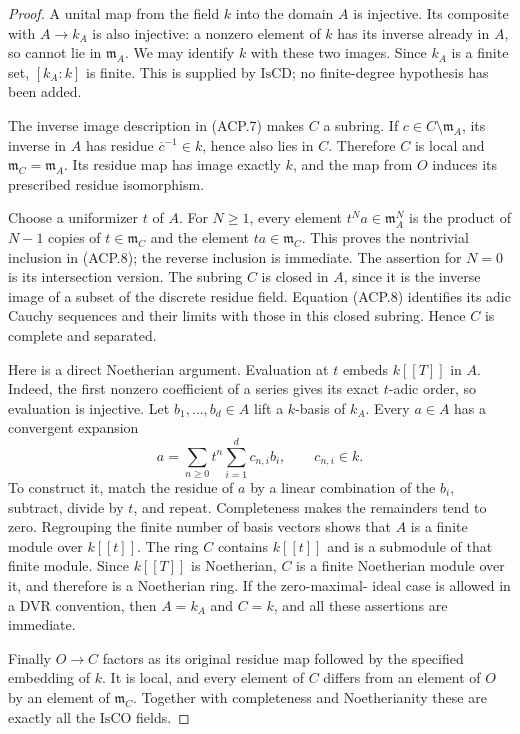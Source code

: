 \documentclass[11pt,a4paper]{article}
\numberwithin{equation}{section}
\theoremstyle{remark}\newtheorem{remark}[theorem]{Remark}
\begin{document}
\begin{proof}
A unital map from the field \(k\) into the domain \(A\) is
injective.  Its composite with \(A\to k_A\) is also injective:
a nonzero element of \(k\) has its inverse already in \(A\),
so cannot lie in \(\mathfrak m_A\).  We may identify \(k\)
with these two images.  Since \(k_A\) is a finite set,
\([k_A:k]\) is finite.  This is supplied by \(\mathrm{IsCD}\);
no finite-degree hypothesis has been added.

The inverse image description in (ACP.7) makes \(C\) a subring.
If \(c\in C\setminus\mathfrak m_A\), its inverse in \(A\)
has residue \(\overline c^{-1}\in k\), hence also lies in \(C\).
Therefore \(C\) is local and \(\mathfrak m_C=\mathfrak m_A\).
Its residue map has image exactly \(k\), and the map from \(O\)
induces its prescribed residue isomorphism.

Choose a uniformizer \(t\) of \(A\).  For \(N\ge1\), every
element \(t^Na\in\mathfrak m_A^N\) is the product of \(N-1\)
copies of \(t\in\mathfrak m_C\) and the element
\(ta\in\mathfrak m_C\).  This proves the nontrivial inclusion
in (ACP.8); the reverse inclusion is immediate.  The assertion
for \(N=0\) is its intersection version.  The subring \(C\) is
closed in \(A\), since it is the inverse image of a subset of the
discrete residue field.  Equation (ACP.8) identifies its adic
Cauchy sequences and their limits with those in this closed
subring.  Hence \(C\) is complete and separated.

Here is a direct Noetherian argument.  Evaluation at \(t\) embeds
\(k[[T]]\) in \(A\).  Indeed, the first nonzero coefficient of
a series gives its exact \(t\)-adic order, so evaluation is
injective.  Let \(b_1,\ldots,b_d\in A\) lift a \(k\)-basis of
\(k_A\).  Every \(a\in A\) has a convergent expansion
\[
 a=\sum_{n\ge0}t^n\sum_{i=1}^d c_{n,i}b_i,
 \qquad c_{n,i}\in k.
                                                        \tag{ACP.9}
\]
To construct it, match the residue of \(a\) by a linear
combination of the \(b_i\), subtract, divide by \(t\), and
repeat.  Completeness makes the remainders tend to zero.
Regrouping the finite number of basis vectors shows that \(A\)
is a finite module over \(k[[t]]\).  The ring \(C\) contains
\(k[[t]]\) and is a submodule of that finite module.  Since
\(k[[T]]\) is Noetherian, \(C\) is a finite Noetherian module
over it, and therefore is a Noetherian ring.  If the zero-maximal-
ideal case is allowed in a DVR convention, then \(A=k_A\) and
\(C=k\), and all these assertions are immediate.

Finally \(O\to C\) factors as its original residue map followed
by the specified embedding of \(k\).  It is local, and every
element of \(C\) differs from an element of \(O\) by an element
of \(\mathfrak m_C\).  Together with completeness and
Noetherianity these are exactly all the \(\mathrm{IsCO}\) fields.
\end{proof}
\end{document}
